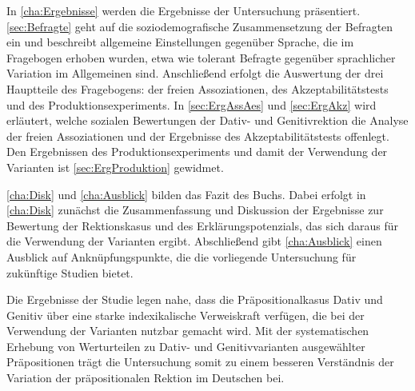 In \autoref{cha:Ergebnisse} werden die Ergebnisse der Untersuchung präsentiert. 
\autoref{sec:Befragte} geht auf die soziodemografische Zusammensetzung der Befragten ein und beschreibt allgemeine Einstellungen gegenüber Sprache, die im Fragebogen erhoben wurden, etwa wie tolerant Befragte gegenüber sprachlicher Variation im Allgemeinen sind. 
Anschließend erfolgt die Auswertung der drei Hauptteile des Fragebogens: der freien Assoziationen, des Akzeptabilitätstests und des Produktionsexperiments. 
In \autoref{sec:ErgAssAes} und \autoref{sec:ErgAkz} wird erläutert, welche sozialen Bewertungen der Dativ- und Genitivrektion die Analyse der freien Assoziationen und der Ergebnisse des Akzeptabilitätstests offenlegt.  
Den Ergebnissen des Produktionsexperiments und damit der Verwendung der Varianten ist \autoref{sec:ErgProduktion} gewidmet. 

\autoref{cha:Disk} und \autoref{cha:Ausblick} bilden das Fazit des Buchs.
Dabei erfolgt in \autoref{cha:Disk} zunächst die Zusammenfassung und Diskussion der Ergebnisse zur Bewertung der Rektionskasus und des Erklärungspotenzials, das sich daraus für die Verwendung der Varianten ergibt. 
Abschließend gibt \autoref{cha:Ausblick} einen Ausblick auf Anknüpfungspunkte, die die vorliegende Untersuchung für zukünftige Studien bietet. 

Die Ergebnisse der Studie legen nahe, dass die Präpositionalkasus Dativ und Genitiv über eine starke indexikalische Verweiskraft verfügen, die bei der Verwendung der Varianten nutzbar gemacht wird.  
Mit der systematischen Erhebung von Werturteilen zu Dativ- und Genitivvarianten ausgewählter Präpositionen trägt die Untersuchung somit zu einem besseren Verständnis der Variation %
der präpositionalen Rektion im Deutschen bei.
